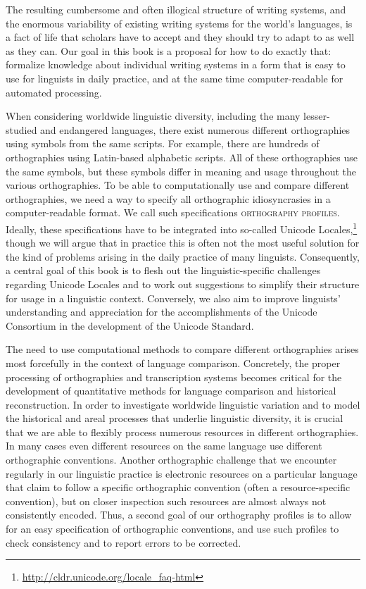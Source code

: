 The resulting cumbersome and often illogical structure of writing systems, and
the enormous variability of existing writing systems for the world's languages, 
is a fact of life that scholars have to accept and they should try to adapt to as well as
they can. Our goal in this book is a proposal for how to do exactly that: formalize 
knowledge about individual writing systems in a form that is easy to use 
for linguists in daily practice, and at the same time computer-readable for 
automated processing.

When considering worldwide linguistic diversity, including the many
lesser-studied and endangered languages, there exist numerous different
orthographies using symbols from the same scripts. For example, there are
hundreds of orthographies using Latin-based alphabetic scripts. All of these
orthographies use the same symbols, but these symbols differ in meaning and
usage throughout the various orthographies. To be able to computationally use
and compare different orthographies, we need a way to specify all orthographic
idiosyncrasies in a computer-readable format. We call such specifications
\textsc{orthography profiles}. Ideally, these specifications have to be
integrated into so-called Unicode Locales,\footnote{\url{http://cldr.unicode.org/locale_faq-html}} 
though we will argue that in practice this is often not the most useful solution for the kind of problems
arising in the daily practice of many linguists. Consequently, a central goal of this book is to flesh out the linguistic-specific challenges regarding Unicode Locales and to work out suggestions to simplify their structure for usage in a linguistic context. Conversely, we also aim to improve linguists' understanding and appreciation for the accomplishments of the Unicode Consortium in the development of the Unicode Standard.

The need to use computational methods to compare different orthographies arises most
forcefully in the context of language comparison. Concretely, the proper
processing of orthographies and transcription systems becomes critical for the
development of quantitative methods for language comparison and historical
reconstruction. In order to investigate worldwide linguistic variation and to
model the historical and areal processes that underlie linguistic
diversity, it is crucial that we are able to flexibly process numerous
resources in different orthographies. In many cases even different resources
on the same language use different orthographic conventions. Another
orthographic challenge that we encounter regularly in our linguistic practice is
electronic resources on a particular language that claim to follow a specific
orthographic convention (often a resource-specific convention), but on closer
inspection such resources are almost always not consistently encoded. Thus, a
second goal of our orthography profiles is to allow for an easy specification of
orthographic conventions, and use such profiles to check consistency and to
report errors to be corrected.

